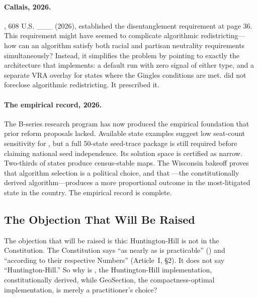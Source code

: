 \paragraph{Callais, 2026.}
\callais{}, 608 U.S. \_\_\_ (2026), established the disentanglement
requirement at page 36.
This requirement might have seemed to complicate algorithmic redistricting---
how can an algorithm satisfy both racial and partisan neutrality requirements
simultaneously?
Instead, it simplifies the problem by pointing to exactly the architecture
that \ar{} implements: a default run with zero signal of either type, and
a separate VRA overlay for states where the Gingles conditions are met.
\callais{} did not foreclose algorithmic redistricting.
It prescribed it.

\paragraph{The empirical record, 2026.}
The B-series research program \citep{b0paper,b7paper,b11paper,b13paper,b15paper}
has now produced the empirical foundation that prior reform proposals lacked.
Available state examples suggest low seat-count sensitivity for \ar{}, but a
full 50-state seed-trace package is still required before claiming national
seed independence.
Its solution space is certified as narrow.
Two-thirds of states produce census-stable maps.
The Wisconsin bakeoff proves that algorithm selection is a political choice,
and that \ar{}---the constitutionally derived algorithm---produces a more
proportional outcome in the most-litigated state in the country.
The empirical record is complete.

\subsection{The Objection That Will Be Raised}

The objection that will be raised is this: Huntington-Hill is not in the
Constitution.
The Constitution says ``as nearly as is practicable'' (\wesberry{}) and
``according to their respective Numbers'' (Article~I, \S2).
It does not say ``Huntington-Hill.''
So why is \ar{}, the Huntington-Hill implementation, constitutionally derived,
while GeoSection, the compactness-optimal implementation, is merely a
practitioner's choice?

